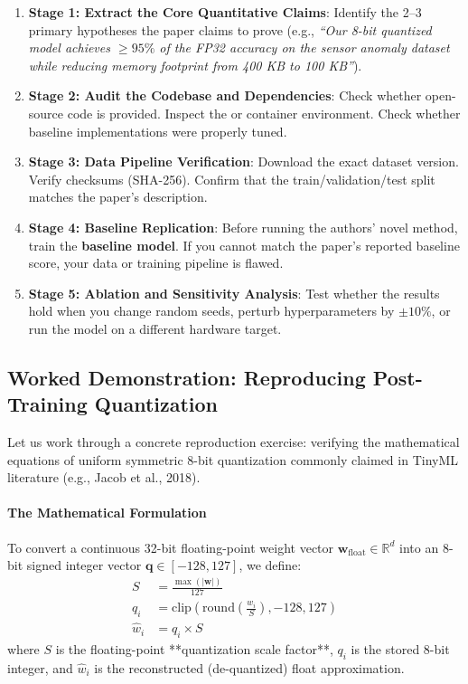 \begin{enumerate}
    \item \textbf{Stage 1: Extract the Core Quantitative Claims}: Identify the 2--3 primary hypotheses the paper claims to prove (e.g., \textit{``Our 8-bit quantized model achieves $\ge 95\%$ of the FP32 accuracy on the sensor anomaly dataset while reducing memory footprint from 400 KB to 100 KB''}).
    \item \textbf{Stage 2: Audit the Codebase and Dependencies}: Check whether open-source code is provided. Inspect the  or container environment. Check whether baseline implementations were properly tuned.
    \item \textbf{Stage 3: Data Pipeline Verification}: Download the exact dataset version. Verify checksums (SHA-256). Confirm that the train/validation/test split matches the paper's description.
    \item \textbf{Stage 4: Baseline Replication}: Before running the authors' novel method, train the \textbf{baseline model}. If you cannot match the paper's reported baseline score, your data or training pipeline is flawed.
    \item \textbf{Stage 5: Ablation and Sensitivity Analysis}: Test whether the results hold when you change random seeds, perturb hyperparameters by $\pm 10\%$, or run the model on a different hardware target.
\end{enumerate}

\subsection{Worked Demonstration: Reproducing Post-Training Quantization}

Let us work through a concrete reproduction exercise: verifying the mathematical equations of uniform symmetric 8-bit quantization commonly claimed in TinyML literature (e.g., Jacob et al., 2018).

\paragraph{The Mathematical Formulation}
To convert a continuous 32-bit floating-point weight vector $\mathbf{w}_{\text{float}} \in \mathbb{R}^d$ into an 8-bit signed integer vector $\mathbf{q} \in [-128, 127]$, we define:
\begin{align}
S &= \frac{\max(|\mathbf{w}|)}{127}\label{eq:quant_scale} \\
q_i &= \text{clip}\left(\text{round}\left(\frac{w_i}{S}\right), -128, 127\right)\label{eq:quant_int8} \\
\hat{w}_i &= q_i \times S\label{eq:dequant}
\end{align}
where $S$ is the floating-point **quantization scale factor**, $q_i$ is the stored 8-bit integer, and $\hat{w}_i$ is the reconstructed (de-quantized) float approximation.

